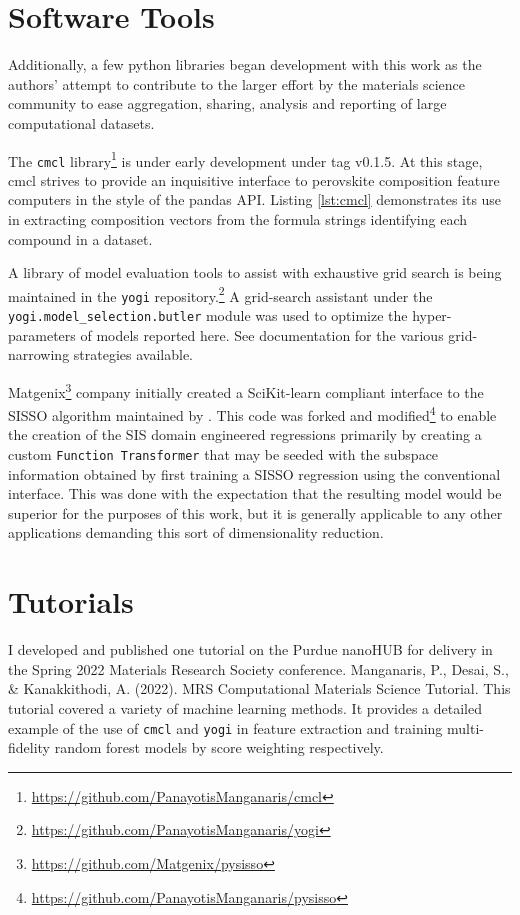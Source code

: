 \section{Software Tools}
\label{sec:org8bf60cc}
Additionally, a few python libraries began development with this work as the authors' attempt to contribute to the larger effort by the materials science community to ease aggregation, sharing, analysis and reporting of large computational datasets.

The \texttt{cmcl} library\footnote{\url{https://github.com/PanayotisManganaris/cmcl}} is under early development under tag v0.1.5.
At this stage, cmcl strives to provide an inquisitive interface to perovskite composition feature computers in the style of the pandas API.
Listing \ref{lst:cmcl} demonstrates its use in extracting composition vectors from the formula strings identifying each compound in a dataset.

A library of model evaluation tools to assist with exhaustive grid search is being maintained in the \texttt{yogi} repository.\footnote{\url{https://github.com/PanayotisManganaris/yogi}}
A grid-search assistant under the \texttt{yogi.model\_selection.butler} module was used to optimize the hyper-parameters of models reported here.
See documentation for the various grid-narrowing strategies available.

Matgenix\footnote{\url{https://github.com/Matgenix/pysisso}} company initially created a SciKit-learn compliant interface to the SISSO algorithm maintained by \textcite{ouyang-2018-sisso}.
This code was forked and modified\footnote{\url{https://github.com/PanayotisManganaris/pysisso}} to enable the creation of the SIS domain engineered regressions primarily by creating a custom \texttt{Function Transformer} that may be seeded with the subspace information obtained by first training a SISSO regression using the conventional interface.
This was done with the expectation that the resulting model would be superior for the purposes of this work, but it is generally applicable to any other applications demanding this sort of dimensionality reduction.

\section{Tutorials}
\label{sec:orgeb81ae8}
I developed and published one tutorial on the Purdue nanoHUB for delivery in the Spring 2022 Materials Research Society conference.
Manganaris, P., Desai, S., \& Kanakkithodi, A. (2022). MRS Computational Materials Science Tutorial.
This tutorial covered a variety of machine learning methods.
It provides a detailed example of the use of \texttt{cmcl} and \texttt{yogi} in feature extraction and training multi-fidelity random forest models by score weighting respectively.
